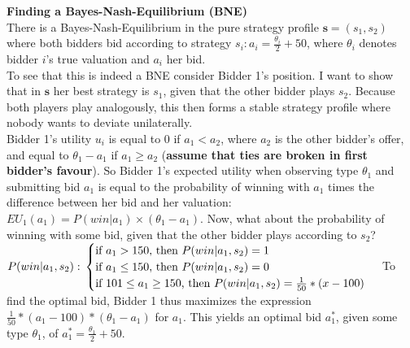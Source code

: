 \documentclass[10pt,a4paper]{article}
\begin{document}
\textbf{Finding a Bayes-Nash-Equilibrium (BNE)}\\
There is a Bayes-Nash-Equilibrium in the pure strategy profile $\bm{s}=(s_1,s_2)$ where both bidders bid according to strategy $s_i: a_i=\tfrac{\theta_i}{2}+50$, where $\theta_i$ denotes bidder $i$'s true valuation and $a_i$ her bid.\\
To see that this is indeed a BNE consider Bidder 1's position. I want to show that in $\bm{s}$ her best strategy is $s_1$, given that the other bidder plays $s_2$. Because both players play 
analogously, this then forms a stable strategy profile where nobody wants to deviate unilaterally.\\
Bidder 1's utility $u_i$ is equal to $0$ if $a_1<a_2$, where $a_2$ is the other bidder's offer, and equal to $\theta_1-a_1$ if $a_1\geq a_2$ (\textbf{assume that ties are broken in first 
bidder's favour}). So Bidder 1's expected utility when observing type $\theta_1$ and submitting bid $a_1$ is equal to the probability of winning with $a_1$ times the difference between her 
bid and her valuation: $EU_1(a_1)=P(win|a_1)\times (\theta_1-a_1)$. Now, what about the probability of winning with some bid, given that the other bidder plays according to $s_2$?\\
$P(win|a_1, s_2):\\
\begin{cases}
\text{if } a_1>150\text{, then }P(win|a_1,s_2)=1\\
\text{if } a_1\leq 150\text{, then }P(win|a_1,s_2)=0\\
\text{if } 101\leq a_1\geq 150\text{, then }P(win|a_1,s_2)=\tfrac{1}{50}*(x-100)\\
\end{cases} $
To find the optimal bid, Bidder 1 thus maximizes the expression $\tfrac{1}{50}*(a_1-100)*(\theta_1-a_1)$ for $a_1$. This yields an optimal bid $a_1^*$, given some type $\theta_1$, of $a_1^*=\tfrac{\theta_1}{2}+50$.\\
\end{document}
